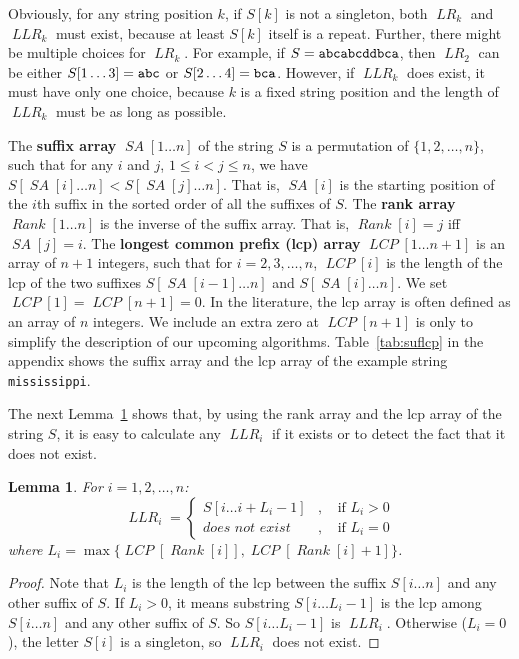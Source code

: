\documentclass[preprint]{elsarticle}
\newtheorem{lemma}{Lemma}[section]
\DeclareMathOperator{\sa}{\mathit{SA}}
\DeclareMathOperator{\rank}{\mathit{Rank}}
\DeclareMathOperator{\lcp}{\mathit{LCP}}
\DeclareMathOperator{\lr}{\mathit{LR}}
\DeclareMathOperator{\llr}{\mathit{LLR}}
\begin{document}
Obviously, 
for any string position $k$, if $S[k]$ is not a singleton, both
$\lr_k$ and $\llr_k$
must exist, because at least $S[k]$ itself is a repeat. 
Further, there might be multiple choices for $\lr_k$. For
example, if $S={\tt abcabcddbca}$, then $\lr_2$ can be either
$S[1\ldots 3]={\tt
  abc}$ or $S[2\ldots 4]={\tt bca}$.
However, if $\llr_k$ does exist, it
must have only one choice, because $k$ is a fixed string position and
the length of $\llr_k$ must be as long as possible.




The {\bf suffix array} $\sa[1\ldots n]$ of the string $S$ is a
permutation of $\{1,2,\ldots, n\}$, such that for any $i$ and $j$,
$1\leq i < j \leq n$, we have $S[\sa[i]\ldots n] < S[\sa[j]\ldots n]$.
That is, $\sa[i]$ is the starting position of the $i$th suffix in
the sorted order of all the suffixes of $S$.
The {\bf rank array} $\rank[1\ldots n]$ is the inverse of the suffix
array. That is, $\rank[i]=j$ iff $\sa[j]=i$. 
The {\bf longest common prefix (lcp) array} $\lcp[1\ldots n+1]$ is an
array of $n+1$ integers, such that for $i=2,3,\ldots, n$, $\lcp[i]$ is
the length of the lcp of the two suffixes $S[\sa[i-1]\ldots n]$ and
$S[\sa[i]\ldots n]$. We set $\lcp[1]=\lcp[n+1]=0$.  In the literature,
the lcp array is often defined as an array of $n$ integers. We include
an extra zero at $\lcp[n+1]$ is only to simplify the description 
of our upcoming
algorithms.  
Table~\ref{tab:suflcp}
in the appendix 
shows the suffix array and the lcp
array of the example string {\tt mississippi}.




The next Lemma~\ref{lem:llr} shows that, by using the rank array and
the lcp array of the string $S$, it is easy to calculate any $\llr_i$ if
it exists or to detect the fact that it does not exist. 




\begin{lemma}
\label{lem:llr}
For $i=1,2,\ldots,n$: 
$$
\llr_i = 
\left \{
\begin{array}{lll}
S[i\ldots i + L_i-1] & , & \textrm{\ \ \ if \ \ } L_i > 0\\
\textit{does not exist} & , & \textrm{\ \ \ if \ \ }L_i = 0
\end{array}
\right.
$$
where $L_i = \max\{\lcp[\rank[i]],\lcp[\rank[i]+1]\}$.
\end{lemma}

\begin{proof}
  Note that $L_i$ is the length of the lcp between the suffix
  $S[i\ldots n]$ and any other suffix of $S$.  If $L_i > 0$, it means
  substring $S[i\ldots L_i-1]$ is the lcp among $S[i\ldots n]$ and any
  other suffix of $S$. So $S[i\ldots L_i-1]$ is $\llr_i$.  Otherwise
  ($L_i = 0$), the letter $S[i]$ is a singleton, so $\llr_i$ does not
  exist.
\end{proof}
\end{document}
